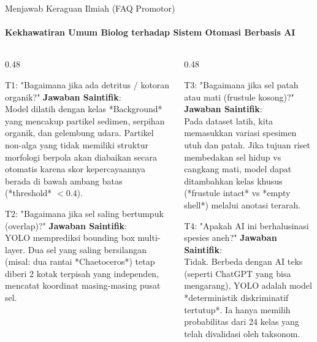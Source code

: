 \documentclass[aspectratio=169, 10pt]{beamer}
\begin{document}
\begin{frame}{Menjawab Keraguan Ilmiah (FAQ Promotor)}
    \framesubtitle{Kekhawatiran Umum Biolog terhadap Sistem Otomasi Berbasis AI}
    
    \begin{columns}[T]
        \begin{column}{0.48\textwidth}
            \begin{alertcard}{T1: "Bagaimana jika ada detritus / kotoran organik?"}
                \scriptsize
                \textbf{Jawaban Saintifik}:\\
                Model dilatih dengan kelas *Background* yang mencakup partikel sedimen, serpihan organik, dan gelembung udara. Partikel non-alga yang tidak memiliki struktur morfologi berpola akan diabaikan secara otomatis karena skor kepercayaannya berada di bawah ambang batas (*threshold* $< 0.4$).
            \end{alertcard}
            \vspace{3pt}
            \begin{alertcard}{T2: "Bagaimana jika sel saling bertumpuk (overlap)?"}
                \scriptsize
                \textbf{Jawaban Saintifik}:\\
                YOLO memprediksi bounding box multi-layer. Dua sel yang saling bersilangan (misal: dua rantai *Chaetoceros*) tetap diberi 2 kotak terpisah yang independen, mencatat koordinat masing-masing pusat sel.
            \end{alertcard}
        \end{column}
        
        \begin{column}{0.48\textwidth}
            \begin{conceptcard}{T3: "Bagaimana jika sel patah atau mati (frustule kosong)?"}
                \scriptsize
                \textbf{Jawaban Saintifik}:\\
                Pada dataset latih, kita memasukkan variasi spesimen utuh dan patah. Jika tujuan riset membedakan sel hidup vs cangkang mati, model dapat ditambahkan kelas khusus (*frustule intact* vs *empty shell*) melalui anotasi terarah.
            \end{conceptcard}
            \vspace{3pt}
            \begin{biocard}{T4: "Apakah AI ini berhalusinasi spesies aneh?"}
                \scriptsize
                \textbf{Jawaban Saintifik}:\\
                Tidak. Berbeda dengan AI teks (seperti ChatGPT yang bisa mengarang), YOLO adalah model *deterministik diskriminatif tertutup*. Ia hanya memilih probabilitas dari 24 kelas yang telah divalidasi oleh taksonom.
            \end{biocard}
        \end{column}
    \end{columns}
\end{frame}
\end{document}
